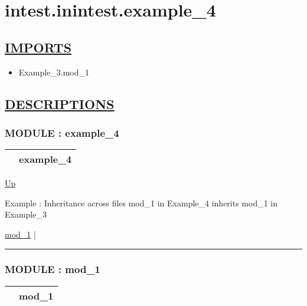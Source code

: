 \chapter*{intest.inintest.example\_4}
\hypertarget{ecldoc:toc:intest.inintest.example_4}{}

\section*{\underline{IMPORTS}}
\begin{itemize}
\item Example\_3.mod\_1
\end{itemize}

\section*{\underline{DESCRIPTIONS}}
\subsection*{MODULE : example\_4}
\hypertarget{ecldoc:intest.inintest.example_4}{}

{\renewcommand{\arraystretch}{1.5}
\begin{tabularx}{\textwidth}{|>{\raggedright\arraybackslash}l|X|}
\hline
\hspace{0pt} & example\_4 \\
\hline
\end{tabularx}
}

\hyperlink{ecldoc:toc:intest/inintest}{Up}

\par
Example : Inheritance across files mod\_1 in Example\_4 inherits mod\_1 in Example\_3


\hyperlink{ecldoc:intest.inintest.example_4.mod_1}{mod\_1}  |

\rule{\textwidth}{0.4pt}

\subsection*{MODULE : mod\_1}
\hypertarget{ecldoc:intest.inintest.example_4.mod_1}{}

{\renewcommand{\arraystretch}{1.5}
\begin{tabularx}{\textwidth}{|>{\raggedright\arraybackslash}l|X|}
\hline
\hspace{0pt} & mod\_1 \\
\hline
\end{tabularx}
}

